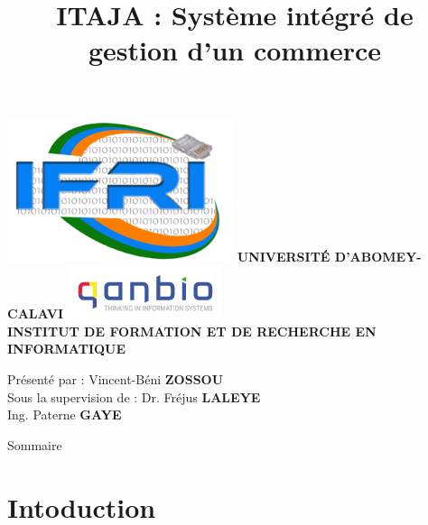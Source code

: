 \documentclass[xcolor=dvipsnames]{beamer}
\title[ITAJA : Système intégré de gestion d’un commerce]{ITAJA : Système intégré de gestion d’un commerce}
\begin{document}

  \begin{frame}{}
    \begin{center}
      \includegraphics[scale=0.15]{images/logoIFRI.png}
      \hspace{1.1cm}
      {\scriptsize \textbf{\textsf{UNIVERSITÉ D'ABOMEY-CALAVI}}}
      \hspace{1.1cm}
      \includegraphics[scale=0.35]{images/logoQanbio.png}\\
      {\footnotesize \textbf {\textsf{INSTITUT DE FORMATION ET DE RECHERCHE EN INFORMATIQUE}}}
    \end{center}
      
    \begin{center}
      \titlepage
      \vspace{-0.4cm}
      Présenté par : Vincent-Béni \textbf{ZOSSOU\\}
      Sous la supervision de : Dr. Fréjus \textbf{LALEYE}\\
      Ing. Paterne \textbf{GAYE}
    \end{center}
  \end{frame}

  \begin{frame}{Sommaire}
    \tableofcontents
  \end{frame}

  \section{Intoduction}  
\end{document}
